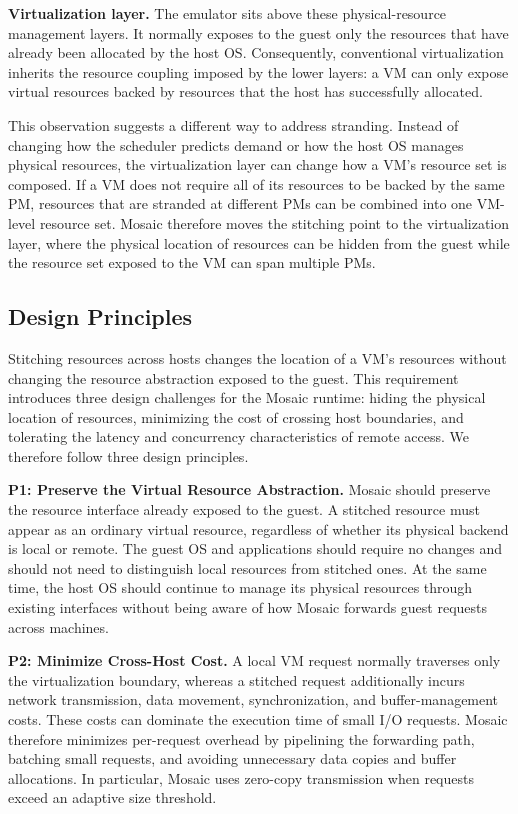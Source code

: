 \documentclass[sigplan,10pt]{acmart}
\begin{document}
\textbf{Virtualization layer.} The emulator sits above these physical-resource management layers. It normally exposes to the guest only the resources that have already been allocated by the host OS. Consequently, conventional virtualization inherits the resource coupling imposed by the lower layers: a VM can only expose virtual resources backed by resources that the host has successfully allocated.

This observation suggests a different way to address stranding. Instead of changing how the scheduler predicts demand or how the host OS manages physical resources, the virtualization layer can change how a VM's resource set is composed. If a VM does not require all of its resources to be backed by the same PM, resources that are stranded at different PMs can be combined into one VM-level resource set. Mosaic therefore moves the stitching point to the virtualization layer, where the physical location of resources can be hidden from the guest while the resource set exposed to the VM can span multiple PMs.

\subsection{Design Principles}

Stitching resources across hosts changes the location of a VM's resources without changing the resource abstraction exposed to the guest. This requirement introduces three design challenges for the Mosaic runtime: hiding the physical location of resources, minimizing the cost of crossing host boundaries, and tolerating the latency and concurrency characteristics of remote access. We therefore follow three design principles.

\textbf{P1: Preserve the Virtual Resource Abstraction.} Mosaic should preserve the resource interface already exposed to the guest. A stitched resource must appear as an ordinary virtual resource, regardless of whether its physical backend is local or remote. The guest OS and applications should require no changes and should not need to distinguish local resources from stitched ones. At the same time, the host OS should continue to manage its physical resources through existing interfaces without being aware of how Mosaic forwards guest requests across machines.

\textbf{P2: Minimize Cross-Host Cost.} A local VM request normally traverses only the virtualization boundary, whereas a stitched request additionally incurs network transmission, data movement, synchronization, and buffer-management costs. These costs can dominate the execution time of small I/O requests. Mosaic therefore minimizes per-request overhead by pipelining the forwarding path, batching small requests, and avoiding unnecessary data copies and buffer allocations. In particular, Mosaic uses zero-copy transmission when requests exceed an adaptive size threshold.
\end{document}
